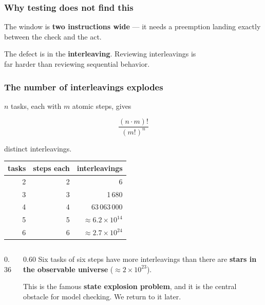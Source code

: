 \begin{frame}
  \frametitle{Why testing does not find this} \small

The window is {\bf two instructions wide} --- it needs a preemption landing
exactly between the check and the act.

\pause
\vspace{0.4cm}

\begin{block}{}\small
\centering
The defect is in the {\bf interleaving}. Reviewing interleavings is\\
far harder than reviewing sequential behavior.
\end{block}

\end{frame}

\begin{frame}
  \frametitle{The number of interleavings explodes} \small

$n$ tasks, each with $m$ atomic steps, gives

\[
\frac{(n \cdot m)!}{(m!)^n}
\]

distinct interleavings.

\vspace{0.15cm}

\begin{center}
\begin{tabular}{r r r}
\toprule
{\bf tasks} & {\bf steps each} & {\bf interleavings}\\
\midrule
2 &  2 & 6 \\
3 &  3 & 1\,680 \\
4 &  4 & 63\,063\,000 \\
5 &  5 & $\approx 6.2 \times 10^{14}$ \\
\rowcolor{red!8}
6 &  6 & $\approx 2.7 \times 10^{24}$ \\
\bottomrule
\end{tabular}
\end{center}

\pause
\vspace{0.1cm}

\begin{columns}[c]
\begin{column}{0.36\textwidth}
\centering
\starfield[0.74]
\end{column}
\begin{column}{0.60\textwidth}\small
Six tasks of six steps have more interleavings than there are
{\bf stars in the observable universe} ($\approx 2 \times 10^{23}$).

\vspace{0.25cm}
\pause
This is the famous {\bf state explosion problem}, and it is the
central obstacle for model checking. We return to it later.
\end{column}
\end{columns}

\end{frame}


